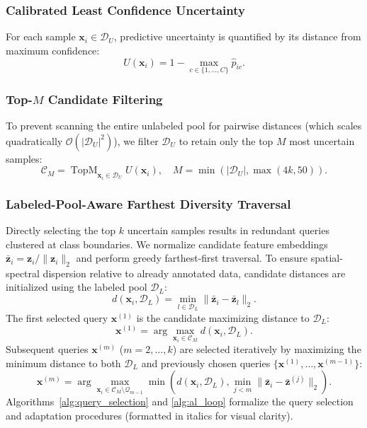 \documentclass[conference,letterpaper]{IEEEtran}
\begin{document}
\subsubsection{Calibrated Least Confidence Uncertainty}
For each sample $\mathbf{x}_i \in \mathcal{D}_U$, predictive uncertainty is quantified by its distance from maximum confidence:
\begin{equation}
U(\mathbf{x}_i) = 1 - \max_{c \in \{1, \dots, C\}} \hat{p}_{ic}.
\end{equation}

\subsubsection{Top-$M$ Candidate Filtering}
To prevent scanning the entire unlabeled pool for pairwise distances (which scales quadratically $\mathcal{O}(|\mathcal{D}_U|^2)$), we filter $\mathcal{D}_U$ to retain only the top $M$ most uncertain samples:
\begin{equation}
\mathcal{C}_M = \operatorname{TopM}_{\mathbf{x}_i \in \mathcal{D}_U} U(\mathbf{x}_i), \quad M = \min\left(|\mathcal{D}_U|, \max(4k, 50)\right).
\end{equation}

\subsubsection{Labeled-Pool-Aware Farthest Diversity Traversal}
Directly selecting the top $k$ uncertain samples results in redundant queries clustered at class boundaries. We normalize candidate feature embeddings $\bar{\mathbf{z}}_i = \mathbf{z}_i / \|\mathbf{z}_i\|_2$ and perform greedy farthest-first traversal. To ensure spatial-spectral dispersion relative to already annotated data, candidate distances are initialized using the labeled pool $\mathcal{D}_L$:
\begin{equation}
d(\mathbf{x}_i, \mathcal{D}_L) = \min_{l \in \mathcal{D}_L} \|\bar{\mathbf{z}}_i - \bar{\mathbf{z}}_l\|_2.
\end{equation}
The first selected query $\mathbf{x}^{(1)}$ is the candidate maximizing distance to $\mathcal{D}_L$:
\begin{equation}
\mathbf{x}^{(1)} = \arg\max_{\mathbf{x}_i \in \mathcal{C}_M} d(\mathbf{x}_i, \mathcal{D}_L).
\end{equation}
Subsequent queries $\mathbf{x}^{(m)}$ ($m=2, \dots, k$) are selected iteratively by maximizing the minimum distance to both $\mathcal{D}_L$ and previously chosen queries $\{\mathbf{x}^{(1)}, \dots, \mathbf{x}^{(m-1)}\}$:
\begin{equation}
\mathbf{x}^{(m)} = \arg\max_{\mathbf{x}_i \in \mathcal{C}_M \setminus \mathcal{Q}_{m-1}} \min\left( d(\mathbf{x}_i, \mathcal{D}_L), \min_{j < m} \|\bar{\mathbf{z}}_i - \bar{\mathbf{z}}^{(j)}\|_2 \right).
\end{equation}
Algorithms~\ref{alg:query_selection} and \ref{alg:al_loop} formalize the query selection and adaptation procedures (formatted in italics for visual clarity).
\end{document}
